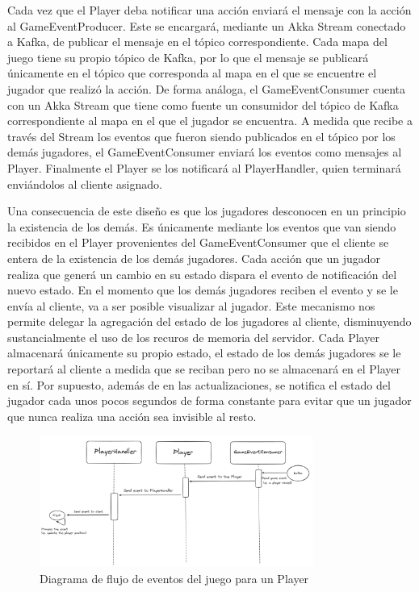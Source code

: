 Cada vez que el Player deba notificar una acción enviará el mensaje con la acción al GameEventProducer. Este se encargará, mediante un Akka Stream conectado a Kafka, de publicar el mensaje
en el tópico correspondiente. Cada mapa del juego tiene su propio tópico de Kafka, por lo que el mensaje se publicará únicamente en el tópico que corresponda al mapa en el que se encuentre el jugador que realizó la acción.
De forma análoga, el GameEventConsumer cuenta con un Akka Stream que tiene como fuente un consumidor del tópico de Kafka correspondiente al mapa en el que el jugador se encuentra. A medida que recibe a través del Stream los
eventos que fueron siendo publicados en el tópico por los demás jugadores, el GameEventConsumer enviará los eventos como mensajes al Player. Finalmente el Player se los notificará al PlayerHandler, quien terminará enviándolos
al cliente asignado.

Una consecuencia de este diseño es que los jugadores desconocen en un principio la existencia de los demás. Es únicamente mediante los eventos que van siendo recibidos en el Player provenientes del GameEventConsumer
que el cliente se entera de la existencia de los demás jugadores. Cada acción que un jugador realiza que generá un cambio en su estado dispara el evento de notificación del nuevo estado. En el momento que los demás jugadores reciben
el evento y se le envía al cliente, va a ser posible visualizar al jugador. Este mecanismo nos permite delegar la agregación del estado de los jugadores al cliente, disminuyendo sustancialmente el uso de los recuros de memoria del servidor.
Cada Player almacenará únicamente su propio estado, el estado de los demás jugadores se le reportará al cliente a medida que se reciban pero no se almacenará en el Player en sí.
Por supuesto, además de en las actualizaciones, se notifica el estado del jugador cada unos pocos segundos de forma constante para evitar que un jugador que nunca realiza una acción sea invisible al resto.

\begin{figure}[htpb]
    \centering
    \includegraphics[width=0.8\textwidth]{../assets/game-event-consumer-example.png}
    \caption{Diagrama de flujo de eventos del juego para un Player}
\end{figure}

